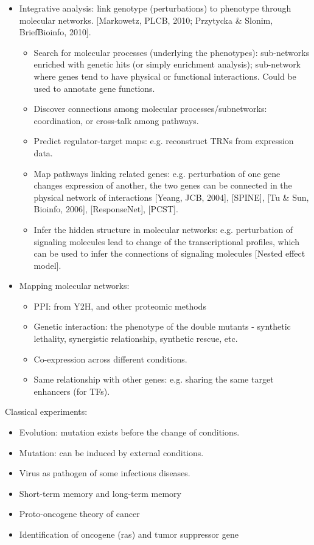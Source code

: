 \documentclass{report}
\begin{document}
\begin{itemize}
\item Integrative analysis: link genotype (perturbations) to phenotype through molecular networks. [Markowetz, PLCB, 2010; Przytycka \& Slonim, BriefBioinfo, 2010]. 
\begin{itemize}
	\item Search for molecular processes (underlying the phenotypes): sub-networks enriched with genetic hits (or simply enrichment analysis); sub-network where genes tend to have physical or functional interactions. Could be used to annotate gene functions. 
	\item Discover connections among molecular processes/subnetworks: coordination, or cross-talk among pathways. 
	\item Predict regulator-target maps: e.g. reconstruct TRNs from expression data. 
	\item Map pathways linking related genes: e.g. perturbation of one gene changes expression of another, the two genes can be connected in the physical network of interactions [Yeang, JCB, 2004], [SPINE], [Tu \& Sun, Bioinfo, 2006], [ResponseNet], [PCST].  
	\item Infer the hidden structure in molecular networks: e.g. perturbation of signaling molecules lead to change of the transcriptional profiles, which can be used to infer the connections of signaling molecules [Nested effect model]. 
\end{itemize}

\item Mapping molecular networks: 
\begin{itemize}
\item PPI: from Y2H, and other proteomic methods
\item Genetic interaction: the phenotype of the double mutants - synthetic lethality, synergistic relationship, synthetic rescue, etc. 
\item Co-expression across different conditions. 
\item Same relationship with other genes: e.g. sharing the same target enhancers (for TFs). 
\end{itemize}
\end{itemize}

Classical experiments: 
\begin{itemize}
\item Evolution: mutation exists before the change of conditions. 
\item Mutation: can be induced by external conditions. 
\item Virus as pathogen of some infectious diseases. 
\item Short-term memory and long-term memory
\item Proto-oncogene theory of cancer
\item Identification of oncogene (ras) and tumor suppressor gene
\end{itemize}
\end{document}
